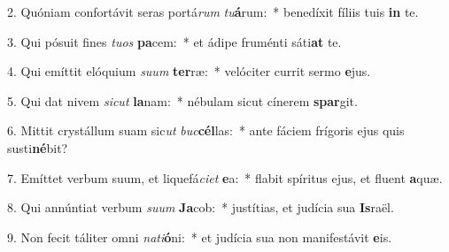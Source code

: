2. Quóniam confortávit seras portá\textit{rum} \textit{tu}\textbf{á}rum:~*  benedíxit fíliis tuis \textbf{in} te.\

3. Qui pósuit fines \textit{tu}\textit{os} \textbf{pa}cem:~*  et ádipe fruménti sáti\textbf{at} te.\

4. Qui emíttit elóquium \textit{su}\textit{um} \textbf{ter}ræ:~*  velóciter currit sermo \textbf{e}jus.\

5. Qui dat nivem \textit{sic}\textit{ut} \textbf{la}nam:~*  nébulam sicut cínerem \textbf{spar}git.\

6. Mittit crystállum suam sic\textit{ut} \textit{buc}\textbf{cél}las:~*  ante fáciem frígoris ejus quis susti\textbf{né}bit?\

7. Emíttet verbum suum, et liquefá\textit{ci}\textit{et} \textbf{e}a:~*  flabit spíritus ejus, et fluent \textbf{a}quæ.\

8. Qui annúntiat verbum \textit{su}\textit{um} \textbf{Ja}cob:~*  justítias, et judícia sua \textbf{Is}raël.\

9. Non fecit táliter omni \textit{na}\textit{ti}\textbf{ó}ni:~*  et judícia sua non manifestávit \textbf{e}is.\

